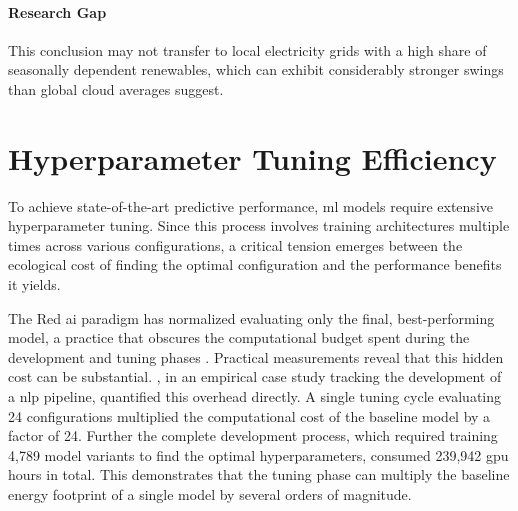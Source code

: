 \paragraph{Research Gap}
This conclusion may not transfer to local electricity grids with a high share of seasonally dependent renewables, which can exhibit considerably stronger swings than global cloud averages suggest. 

\section{Hyperparameter Tuning Efficiency}
\label{sec:tuning_efficiency}

To achieve state-of-the-art predictive performance, \gls{ml} models require extensive hyperparameter tuning. Since this process involves training architectures multiple times across various configurations, a critical tension emerges between the ecological cost of finding the optimal configuration and the performance benefits it yields.

The Red \gls{ai} paradigm has normalized evaluating only the final, best-performing model, a practice that obscures the computational budget spent during the development and tuning phases \cite{schwartzGreenAI2020}. Practical measurements reveal that this hidden cost can be substantial. \citeauthor{strubellEnergyPolicyConsiderations2019a} \cite{strubellEnergyPolicyConsiderations2019a}, in an empirical case study tracking the development of a \gls{nlp} pipeline, quantified this overhead directly. A single tuning cycle evaluating 24 configurations multiplied the computational cost of the baseline model by a factor of 24. Further the complete development process, which required training 4{,}789 model variants to find the optimal hyperparameters, consumed 239{,}942 \gls{gpu} hours in total. This demonstrates that the tuning phase can multiply the baseline energy footprint of a single model by several orders of magnitude.


